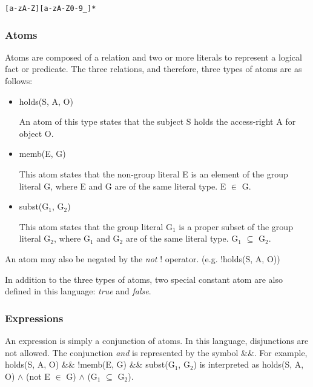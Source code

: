 \documentclass[a4paper]{article}
\begin{document}
\begin{verbatim}
[a-zA-Z][a-zA-Z0-9_]*
\end{verbatim}

      \subsubsection{Atoms}

        Atoms are composed of a relation and two or more literals to represent
        a logical fact or predicate. The three relations, and therefore, three
        types of atoms are as follows:

        \begin{itemize}

          \item holds(S, A, O)

            An atom of this type states that the subject S holds the
            access-right A for object O.

          \item memb(E, G)

          This atom states that the non-group literal E is an element of the
          group literal G, where E and G are of the same literal type.
          E $\in$ G.

          \item subst(G$_{1}$, G$_{2}$)

          This atom states that the group literal G$_{1}$ is a proper
          subset of the group literal G$_{2}$, where G$_{1}$ and G$_{2}$
          are of the same literal type. G$_{1}$ $\subseteq$ G$_{2}$.

        \end{itemize}

        An atom may also be negated by the \emph{not} ! operator. (e.g.
        !holds(S, A, O))

        In addition to the three types of atoms, two special constant atom are
        also defined in this language: \emph{true} and \emph{false}.

      \subsubsection{Expressions}

        An expression is simply a conjunction of atoms. In this language,
        disjunctions are not allowed. The conjunction \emph{and} is 
        represented by the symbol \&\&. For example, holds(S, A, O) \&\& 
        !memb(E, G) \&\& subst(G$_{1}$, G$_{2}$) is interpreted as
        holds(S, A, O) $\land$ (not E $\in$ G) $\land$ (G$_{1}$
        $\subseteq$ G$_{2}$).
\end{document}
